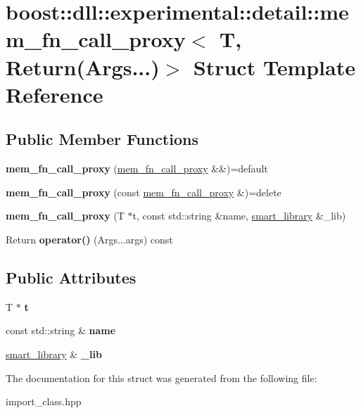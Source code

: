 \hypertarget{a01660}{}\section{boost\+:\+:dll\+:\+:experimental\+:\+:detail\+:\+:mem\+\_\+fn\+\_\+call\+\_\+proxy$<$ T, Return(Args...)$>$ Struct Template Reference}
\label{a01660}
\subsection*{Public Member Functions}
\begin{DoxyCompactItemize}
\item 
\mbox{\label{a01660_a529332d1b9614643dd31697e74fab161}} 
{\bfseries mem\+\_\+fn\+\_\+call\+\_\+proxy} (\hyperlink{a01652}{mem\+\_\+fn\+\_\+call\+\_\+proxy} \&\&)=default
\item 
\mbox{\label{a01660_a85975dbd8e6fbe357161a5d88267a867}} 
{\bfseries mem\+\_\+fn\+\_\+call\+\_\+proxy} (const \hyperlink{a01652}{mem\+\_\+fn\+\_\+call\+\_\+proxy} \&)=delete
\item 
\mbox{\label{a01660_a92aad9def8ffeff646826e158a4acf11}} 
{\bfseries mem\+\_\+fn\+\_\+call\+\_\+proxy} (T $\ast$t, const std\+::string \&name, \hyperlink{a01712}{smart\+\_\+library} \&\+\_\+lib)
\item 
\mbox{\label{a01660_ac7cffb36851b507a423a1ac8831a6e7a}} 
Return {\bfseries operator()} (Args...\+args) const
\end{DoxyCompactItemize}
\subsection*{Public Attributes}
\begin{DoxyCompactItemize}
\item 
\mbox{\label{a01660_a4484ec7a0868324504800d21488602b7}} 
T $\ast$ {\bfseries t}
\item 
\mbox{\label{a01660_ab3fa621f0a26c80ddaecf902ce9d2bca}} 
const std\+::string \& {\bfseries name}
\item 
\mbox{\label{a01660_ac408eec8d4c534affe8584a1c043aaf5}} 
\hyperlink{a01712}{smart\+\_\+library} \& {\bfseries \+\_\+lib}
\end{DoxyCompactItemize}


The documentation for this struct was generated from the following file\+:\begin{DoxyCompactItemize}
\item 
import\+\_\+class.\+hpp\end{DoxyCompactItemize}
